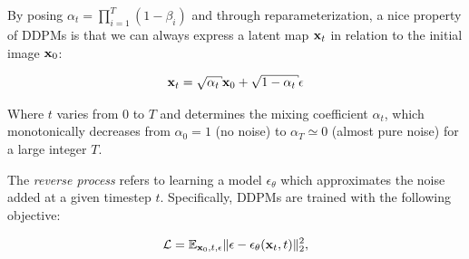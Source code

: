 By posing $\alpha_t = \prod_{i=1}^{T} (1 - \beta_i)$ and through reparameterization, 
a nice property of \ac{DDPM}s is that we can always express a latent map $\mathbf{x}_t$ in relation 
to the initial image $\mathbf{x}_0$:

\begin{equation}
      \x_t = \sqrt{\alpha_t} \x_0 +  \sqrt{1 - \alpha_t} \epsilon
\end{equation}

Where $t$ varies from $0$ to $T$ and determines the mixing coefficient $\alpha_t$, which monotonically 
decreases from  $\alpha_0 = 1$ (no noise) to $\alpha_T \simeq 0$ (almost pure noise) for a large integer $T$.


The \emph{reverse process} refers to learning a model  $\epsilon_\theta$  which approximates the noise added at a given 
timestep $t$. Specifically, \ac{DDPM}s are trained with the following objective:

\begin{equation}
      \mathcal{L} = \displaystyle \mathbb{E}_{\mathbf{x}_0, t, \epsilon} \Vert \epsilon - \epsilon_\theta(\mathbf{x}_t, t) \Vert_2^2,
\end{equation}










